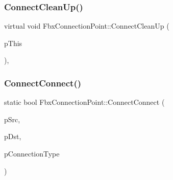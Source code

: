 \mbox{\label{class_fbx_connection_point_a70d121e5f4200dade54c1f0746f4d540}} 
\subsubsection{\texorpdfstring{Connect\+Clean\+Up()}{ConnectCleanUp()}}
{\footnotesize\ttfamily virtual void Fbx\+Connection\+Point\+::\+Connect\+Clean\+Up (\begin{DoxyParamCaption}\item[{\hyperlink{class_fbx_connection_point}{Fbx\+Connection\+Point} $\ast$}]{p\+This }\end{DoxyParamCaption})\hspace{0.3cm}{\ttfamily [protected]}, {\ttfamily [virtual]}}

\mbox{\label{class_fbx_connection_point_a31037bc6920c4391972e0293ff48d757}} 
\subsubsection{\texorpdfstring{Connect\+Connect()}{ConnectConnect()}}
{\footnotesize\ttfamily static bool Fbx\+Connection\+Point\+::\+Connect\+Connect (\begin{DoxyParamCaption}\item[{\hyperlink{class_fbx_connection_point}{Fbx\+Connection\+Point} $\ast$}]{p\+Src,  }\item[{\hyperlink{class_fbx_connection_point}{Fbx\+Connection\+Point} $\ast$}]{p\+Dst,  }\item[{\hyperlink{class_fbx_connection_a3df448a5db356652ab99fd2be2553749}{Fbx\+Connection\+::\+E\+Type}}]{p\+Connection\+Type }\end{DoxyParamCaption})\hspace{0.3cm}{\ttfamily [static]}}

\mbox{\label{class_fbx_connection_point_a1cc755165b835c7ae2b5f4073477cef0}} 

